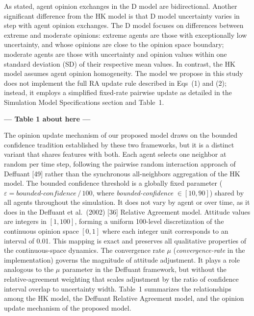 \documentclass[10pt,letterpaper]{article}
\begin{document}
As stated, agent opinion exchanges in the D model are bidirectional. Another significant difference from the HK model is that D model uncertainty varies in step with agent opinion exchanges. The D model focuses on differences between extreme and moderate opinions: extreme agents are those with exceptionally low uncertainty, and whose opinions are close to the opinion space boundary; moderate agents are those with uncertainty and opinion values within one standard deviation (SD) of their respective mean values. In contrast, the HK model assumes agent opinion homogeneity. The model we propose in this study does not implement the full RA update rule described in Eqs~(1) and (2); instead, it employs a simplified fixed-rate pairwise update as detailed in the Simulation Model Specifications section and Table~1.



\begin{center}\textbf{--- Table 1 about here ---}\end{center}


The opinion update mechanism of our proposed model draws on the bounded confidence tradition established by these two frameworks, but it is a distinct variant that shares features with both. Each agent selects one neighbor at random per time step, following the pairwise random interaction approach of Deffuant [49] rather than the synchronous all-neighbors aggregation of the HK model. The bounded confidence threshold is a globally fixed parameter ($\varepsilon = \textit{bounded-confidence}\,/\,100$, where \textit{bounded-confidence} $\in [10, 90]$) shared by all agents throughout the simulation. It does not vary by agent or over time, as it does in the Deffuant et al.\ (2002) [36] Relative Agreement model. Attitude values are integers in $[1, 100]$, forming a uniform 100-level discretization of the continuous opinion space $[0, 1]$ where each integer unit corresponds to an interval of 0.01. This mapping is exact and preserves all qualitative properties of the continuous-space dynamics. The convergence rate $\mu$ (\textit{convergence-rate} in the implementation) governs the magnitude of attitude adjustment. It plays a role analogous to the $\mu$ parameter in the Deffuant framework, but without the relative-agreement weighting that scales adjustment by the ratio of confidence interval overlap to uncertainty width. Table~1 summarizes the relationships among the HK model, the Deffuant Relative Agreement model, and the opinion update mechanism of the proposed model.
\end{document}
